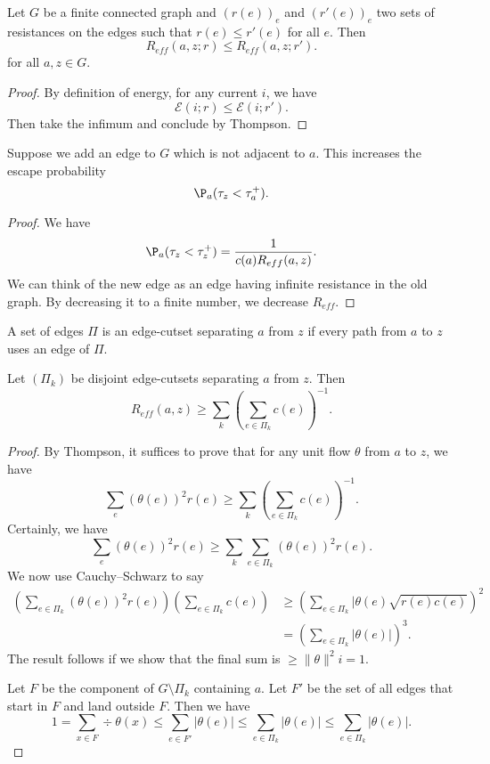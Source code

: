 \documentclass[a4paper]{article}
\begin{document}
\begin{thm}
  Let $G$ be a finite connected graph and $(r(e))_e$ and $(r'(e))_e$ two sets of resistances on the edges such that $r(e) \leq r'(e)$ for all $e$. Then
  \[
    R_{eff}(a, z; r) \leq R_{eff}(a, z; r').
  \]
  for all $a, z \in G$.
\end{thm}

\begin{proof}
  By definition of energy, for any current $i$, we have
  \[
    \mathcal{E}(i; r) \leq \mathcal{E}(i; r').
  \]
  Then take the infimum and conclude by Thompson.
\end{proof}

\begin{cor}
  Suppose we add an edge to $G$ which is not adjacent to $a$. This increases the escape probability
  \[
    \P_a(\tau_z < \tau_a^+).
  \]
\end{cor}

\begin{proof}
  We have
  \[
    \P_a(\tau_z < \tau_z^+) = \frac{1}{c(a) R_{eff}(a, z)}.
  \]
  We can think of the new edge as an edge having infinite resistance in the old graph. By decreasing it to a finite number, we decrease $R_{eff}$.
\end{proof}

\begin{defi}
  A set of edges $\Pi$ is an edge-cutset separating $a$ from $z$ if every path from $a$ to $z$ uses an edge of $\Pi$.
\end{defi}

\begin{thm}
  Let $(\Pi_k)$ be disjoint edge-cutsets separating $a$ from $z$. Then
  \[
    R_{eff}(a, z) \geq \sum_k \left(\sum_{e \in \Pi_k}c(e)\right)^{-1}.
  \]
\end{thm}

\begin{proof}
  By Thompson, it suffices to prove that for any unit flow $\theta$ from $a$ to $z$, we have
  \[
    \sum_e (\theta(e))^2 r(e) \geq \sum_k \left(\sum_{e \in \Pi_k}c(e)\right)^{-1}.
  \]
  Certainly, we have
  \[
    \sum_e (\theta(e))^2 r(e) \geq \sum_k \sum_{e \in \Pi_k}(\theta(e))^2 r(e).
  \]
  We now use Cauchy--Schwarz to say
  \begin{align*}
    \left(\sum_{e \in \Pi_k} (\theta(e))^2 r(e)\right) \left(\sum_{e \in \Pi_k}c(e)\right) &\geq \left(\sum_{e \in \Pi_k} |\theta(e) \sqrt{r(e) c(e)} \right)^2\\
    &= \left(\sum_{e \in \Pi_k} |\theta(e)|\right)^3.
  \end{align*}
  The result follows if we show that the final sum is $\geq \|\theta\|^2i = 1$.

  Let $F$ be the component of $G \setminus \Pi_k$ containing $a$. Let $F'$ be the set of all edges that start in $F$ and land outside $F$. Then we have
  \[
    1 = \sum_{x \in F} \div \theta(x) \leq \sum_{e \in F'} |\theta(e)| \leq \sum_{e \in \Pi_k} |\theta(e)| \leq \sum_{e \in \Pi_k} |\theta(e)|.
  \]
\end{proof}
\end{document}

